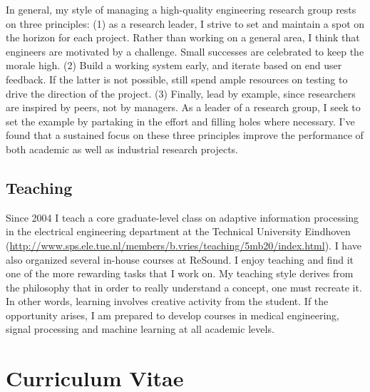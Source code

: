 \documentclass[11pt]{article}
\begin{document}
\medskip
In general, my style of managing a high-quality engineering research group rests on three principles: (1) as a research leader, I strive to set and maintain a spot on the horizon for each project. Rather than working on a general area, I think that engineers are motivated by a challenge. Small successes are celebrated to keep the morale high. (2) Build a working system early, and iterate based on end user feedback. If the latter is not possible, still spend ample resources on testing to drive the direction of the project. (3) Finally, lead by example, since researchers are inspired by peers, not by managers. As a leader of a research group, I seek to set the example by partaking in the effort and filling holes where necessary. I've found that a sustained focus on these three principles improve the performance of both academic as well as industrial research projects.  

\subsection{Teaching} \vspace{-5mm}
Since 2004 I teach a core graduate-level class on adaptive information processing in the electrical engineering department at the Technical University Eindhoven (\url{http://www.sps.ele.tue.nl/members/b.vries/teaching/5mb20/index.html}). I have also organized several in-house courses at ReSound. I enjoy teaching and find it one of the more rewarding tasks that I work on. My teaching style derives from the philosophy that in order to really understand a concept, one must recreate it. In other words, learning involves creative activity from the student.  If the opportunity arises, I am prepared to develop courses in medical engineering, signal processing and machine learning at all academic levels. 


\newpage
\section{Curriculum Vitae}

\begin{llist}









\end{llist}
\end{document}
